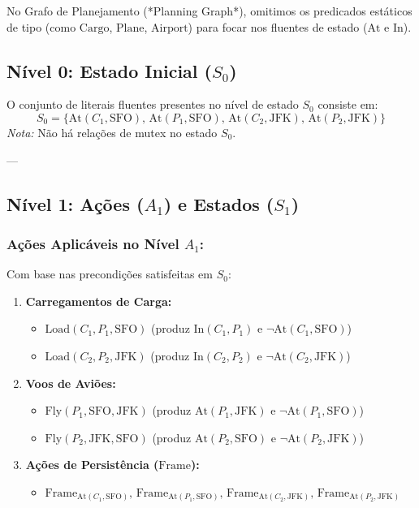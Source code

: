 \documentclass[a4paper,12pt]{article}
\begin{document}
\bigskip


No Grafo de Planejamento (*Planning Graph*), omitimos os predicados estáticos de tipo (como $\text{Cargo}$, $\text{Plane}$, $\text{Airport}$) para focar nos fluentes de estado ($\text{At}$ e $\text{In}$).

\subsection*{Nível 0: Estado Inicial ($S_0$)}
O conjunto de literais fluentes presentes no nível de estado $S_0$ consiste em:
\begin{equation}
	S_0 = \{ \text{At}(C_1, \text{SFO}), \, \text{At}(P_1, \text{SFO}), \, \text{At}(C_2, \text{JFK}), \, \text{At}(P_2, \text{JFK}) \}
\end{equation}
\textit{Nota:} Não há relações de mutex no estado $S_0$.

---

\subsection*{Nível 1: Ações ($A_1$) e Estados ($S_1$)}

\subsubsection*{Ações Aplicáveis no Nível $A_1$:}
Com base nas precondições satisfeitas em $S_0$:
\begin{enumerate}
	\item \textbf{Carregamentos de Carga:}
	\begin{itemize}
		\item $\text{Load}(C_1, P_1, \text{SFO})$ (produz $\text{In}(C_1, P_1)$ e $\neg \text{At}(C_1, \text{SFO})$)
		\item $\text{Load}(C_2, P_2, \text{JFK})$ (produz $\text{In}(C_2, P_2)$ e $\neg \text{At}(C_2, \text{JFK})$)
	\end{itemize}
	
	\item \textbf{Voos de Aviões:}
	\begin{itemize}
		\item $\text{Fly}(P_1, \text{SFO}, \text{JFK})$ (produz $\text{At}(P_1, \text{JFK})$ e $\neg \text{At}(P_1, \text{SFO})$)
		\item $\text{Fly}(P_2, \text{JFK}, \text{SFO})$ (produz $\text{At}(P_2, \text{SFO})$ e $\neg \text{At}(P_2, \text{JFK})$)
	\end{itemize}
	
	\item \textbf{Ações de Persistência ($\text{Frame}$):}
	\begin{itemize}
		\item $\text{Frame}_{\text{At}(C_1, \text{SFO})}, \, \text{Frame}_{\text{At}(P_1, \text{SFO})}, \, \text{Frame}_{\text{At}(C_2, \text{JFK})}, \, \text{Frame}_{\text{At}(P_2, \text{JFK})}$
	\end{itemize}
\end{enumerate}
\end{document}
